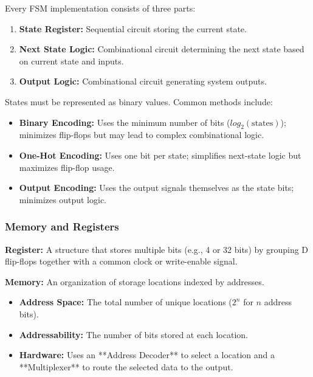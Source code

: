 \begin{remark}
	Every FSM implementation consists of three parts:
	\begin{enumerate}
		\item \textbf{State Register:} Sequential circuit storing the current state.
		\item \textbf{Next State Logic:} Combinational circuit determining the next state based on current state and inputs.
		\item \textbf{Output Logic:} Combinational circuit generating system outputs.
	\end{enumerate}
\end{remark}

\begin{example}
	States must be represented as binary values. Common methods include:
	\begin{itemize}
		\item \textbf{Binary Encoding:} Uses the minimum number of bits ($log_2(\text{states})$); minimizes flip-flops but may lead to complex combinational logic.
		\item \textbf{One-Hot Encoding:} Uses one bit per state; simplifies next-state logic but maximizes flip-flop usage.
		\item \textbf{Output Encoding:} Uses the output signals themselves as the state bits; minimizes output logic.
	\end{itemize}
\end{example}

\subsubsection{Memory and Registers}

\begin{definition}
	\textbf{Register:} A structure that stores multiple bits (e.g., 4 or 32 bits) by grouping D flip-flops together with a common clock or write-enable signal.
\end{definition}

\begin{definition}
	\textbf{Memory:} An organization of storage locations indexed by addresses.
	\begin{itemize}
		\item \textbf{Address Space:} The total number of unique locations ($2^n$ for $n$ address bits).
		\item \textbf{Addressability:} The number of bits stored at each location.
		\item \textbf{Hardware:} Uses an **Address Decoder** to select a location and a **Multiplexer** to route the selected data to the output.
	\end{itemize}
\end{definition}

